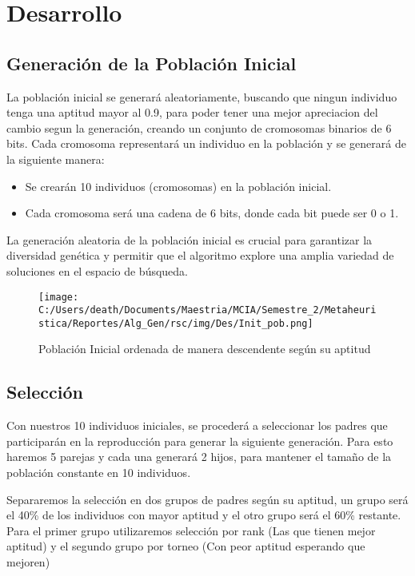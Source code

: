 \section{Desarrollo}

\subsection{Generación de la Población Inicial}
La población inicial se generará aleatoriamente, buscando que ningun individuo tenga una aptitud mayor al 0.9,
para poder tener una mejor apreciacion del cambio segun la generación, creando un conjunto de cromosomas binarios de 6 bits. 
Cada cromosoma representará un individuo en la población y se generará de la siguiente manera:

\begin{itemize}
    \item Se crearán 10 individuos (cromosomas) en la población inicial.
    \item Cada cromosoma será una cadena de 6 bits, donde cada bit puede ser 0 o 1.
\end{itemize}

La generación aleatoria de la población inicial es crucial para garantizar la diversidad genética y permitir 
que el algoritmo explore una amplia variedad de soluciones en el espacio de búsqueda.

\begin{figure} [H]
    \centering
    \texttt{[image: C:/Users/death/Documents/Maestria/MCIA/Semestre\_2/Metaheuristica/Reportes/Alg\_Gen/rsc/img/Des/Init\_pob.png]}
    \caption{Población Inicial ordenada de manera descendente según su aptitud}\label{PoblacionInicial}
\end{figure}

\subsection{Selección}

Con nuestros 10 individuos iniciales, se procederá a seleccionar los padres que participarán en la reproducción para generar
la siguiente generación. Para esto haremos 5 parejas y cada una generará 2 hijos, para mantener el tamaño de la población constante en 10 individuos.

Separaremos la selección en dos grupos de padres según su aptitud, un grupo será el 40\% de los individuos con mayor aptitud y el otro grupo será el 60\% restante.
Para el primer grupo utilizaremos selección por rank (Las que tienen mejor aptitud) y el segundo grupo por torneo (Con peor aptitud esperando que mejoren)

